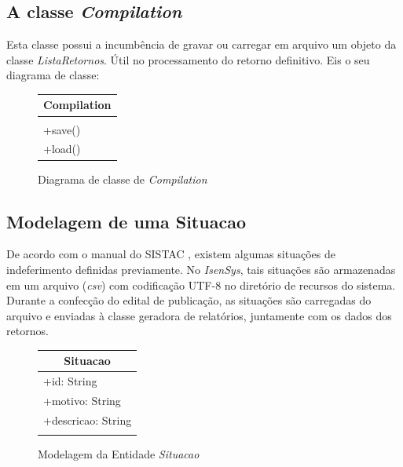 \documentclass[
	12pt,			%
	openright,		%
	oneside,	
	a4paper,		%
	english,		%
	brazil			%
]{abntex2/abntex2}  %
\begin{document}
	\subsection{A classe \textit{Compilation}}
	
	Esta classe possui a incumbência de gravar ou carregar em arquivo um objeto da classe \textit{ListaRetornos}. Útil no processamento do retorno definitivo. Eis o seu diagrama de classe:
	
	\begin{figure}[H]
		\begin{center}
			
			\caption{Diagrama de classe de \textit{Compilation}}
			\label{compilation-uml}
			
			\begin{tabular}{|l|}
			\hline
			\multicolumn{1}{|c|}{\textbf{Compilation}} \\ \hline
			\\ \hline
			+save()                                    \\
			+load()                                    \\ \hline
			\end{tabular}
			
			
		\end{center}
	\end{figure}	
	
	\subsection{Modelagem de uma Situacao}
	
	De acordo com o manual do SISTAC \cite{sistac-formatos}, existem algumas situações de indeferimento definidas previamente. No \textit{IsenSys}, tais situações são armazenadas em um arquivo (\textit{csv}) com codificação UTF-8 no diretório de recursos do sistema. Durante a confecção do edital de publicação, as situações são carregadas do arquivo e enviadas à classe geradora de relatórios, juntamente com os dados dos retornos.
	
	\begin{figure}[H]
		\begin{center}
			
			\caption{Modelagem da Entidade \textit{Situacao}}
			\label{situacao-uml}
			
			\begin{tabular}{|l|}
				\hline
				\multicolumn{1}{|c|}{\textbf{Situacao}} \\ \hline
				+id: String                             \\
				+motivo: String                         \\
				+descricao: String                      \\ \hline
				                                        \\ \hline
			\end{tabular}
			
			
		\end{center}
	\end{figure}
	
\end{document}
